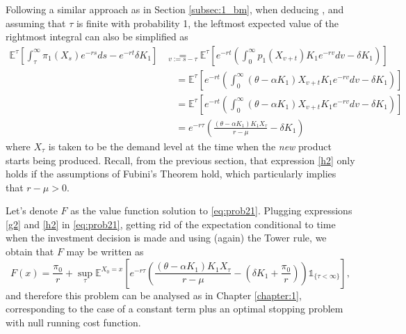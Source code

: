 Following a similar approach as in Section \ref{subsec:1_bm}, when deducing , and assuming that $\tau$ is finite with probability 1, the leftmost expected value of the rightmost integral can also be simplified as
\begin{align}
\mathds{E}^{\tau} \left[  \int_\tau^\infty \pi_1(X_s)e^{-rs} ds -e^{-rt}\delta K_1 \right]
&\underset{v:=s-\tau}{=}  \mathds{E}^{\tau} \left[  e^{-rt} \left( \int_0^\infty p_1(X_{v+t}) K_1e^{-rv} dv -\delta K_1 \right) \right] \nonumber \\
& \quad = \mathds{E}^{\tau} \left[ e^{-rt} \left( \int_0^\infty (\theta-\alpha K_1)X_{v+t} K_1e^{-rv} dv -\delta K_1 \right) \right] \nonumber \\
& \quad = \mathds{E}^{\tau} \left[ e^{-rt} \left( \int_0^\infty (\theta-\alpha K_1)X_{v+t} K_1e^{-rv} dv -\delta K_1 \right) \right] \nonumber \\
& \quad = e^{-r\tau} \left( \frac{(\theta-\alpha K_1)K_1 X_\tau}{r-\mu} -\delta K_1 \right)
\label{h2}
\end{align}
where $X_\tau$ is taken to be the demand level at the time when the \textit{new} product starts being produced. Recall, from the previous section, that expression \eqref{h2} only holds if the assumptions of Fubini's Theorem hold, which particularly implies that $r-\mu>0$.

Let's denote $F$ as the value function solution to \eqref{eq:prob21}. Plugging expressions \eqref{g2} and \eqref{h2} in \eqref{eq:prob21}, getting rid of the expectation conditional to time when the investment decision is made and using (again) the Tower rule, we obtain that $F$ may be written as
\begin{equation}
F(x)=\frac{\pi_0}{r}+ \sup _\tau \mathds{E}^{X_0=x} \left[ e^{-r\tau}\left(\frac{(\theta-\alpha K_1)K_1 X_\tau}{r-\mu} - \left( \delta K_1  +\frac{\pi_0}{r}\right)  \right) \mathds{1}_{ \{\tau < \infty \} } \right],
\label{prob235}
\end{equation}
and therefore this problem can be analysed as in Chapter \ref{chapter:1}, corresponding to the case of a constant term plus an optimal stopping problem with null running cost function. 

